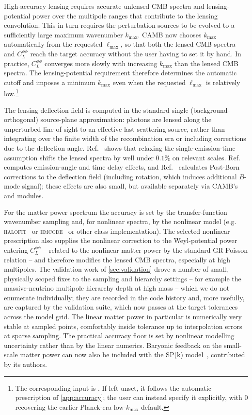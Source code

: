 \documentclass[prd, twocolumn, superscriptaddress, tightenlines, longbibliography, nofootinbib, eqsecnum, amsfonts, amsmath, floatfix, notitlepage]{revtex4-2}
\newcommand{\code}[1]{\texttt{\detokenize{#1}}}
\begin{document}
High-accuracy lensing requires accurate unlensed CMB spectra and lensing-potential
power over the multipole ranges that contribute to the lensing convolution. This
in turn requires the perturbation sources to be evolved to a sufficiently large
maximum wavenumber $k_{\max}$. \textsc{CAMB} now chooses $k_{\max}$
automatically from the requested $\ell_{\max}$, so that both the lensed CMB
spectra and $C_L^{\phi\phi}$ reach the target accuracy without the user having to
set it by hand. In practice, $C_L^{\phi\phi}$ converges more slowly with
increasing $k_{\max}$ than the lensed CMB spectra. The lensing-potential
requirement therefore determines the automatic cutoff and imposes a minimum
$k_{\max}$ even when the requested $\ell_{\max}$ is relatively low.\footnote{The
corresponding input is \code{lens_potential_accuracy}. If left unset, it follows
the automatic prescription of \cref{app:accuracy}; the user can instead specify
it explicitly, with $0$ recovering the earlier Planck-era low-$k_{\max}$
default.}

The lensing deflection field is computed in the standard single
(background-orthogonal) source-plane approximation: photons are lensed along
the unperturbed line of sight to an effective last-scattering source, rather
than integrating over the finite width of the recombination era or including
corrections due to the deflection angle. Ref.~\cite{Hadzhiyska:2017nqe}
shows that relaxing the single-emission-time assumption shifts the lensed
spectra by well under $0.1\%$ on relevant scales. Ref.~\cite{Lewis:2017ans} computes
emission-angle and time delay effects, and Ref.~\cite{Pratten:2016dsm} calculates
Post-Born corrections to the deflection field (including rotation, which induces additional $B$-mode signal);
these effects are also small, but available separately via \textsc{CAMB}'s \code{emission_angle} and \code{postborn} modules.

For the matter power spectrum the accuracy is set by the transfer-function
wavenumber sampling and, for nonlinear spectra, by the nonlinear model
(e.g. \textsc{halofit}~\cite{Takahashi:2012em} or
\textsc{hmcode}~\cite{Mead:2020vgs} or other \code{NonLinear} class implementation). The selected nonlinear prescription also supplies
the nonlinear correction to the Weyl-potential power entering $C_L^{\phi\phi}$ -- related
to the nonlinear matter power by the standard GR Poisson relation -- and therefore modifies
the lensed CMB spectra, especially at high multipoles.
The validation work of
\cref{sec:validation} drove a number of small, physically scoped fixes to the
sampling and hierarchy settings -- for example the massive-neutrino multipole
hierarchy depth at high mass -- which we do not enumerate individually; they are
recorded in the code history and, more usefully, are captured by the validation
suite, which now passes at the target tolerances across the model grid. The
linear matter power in particular is numerically very stable at sampled points, comfortably inside
tolerance up to interpolation errors at sparse sampling. The practical accuracy floor is set by nonlinear modelling uncertainty rather than by the linear numerics. Baryonic feedback on the
small-scale matter power can now also be included with the \textsc{SP}(k)
model~\cite{Salcido:2023etq}, contributed by its authors.
\end{document}
